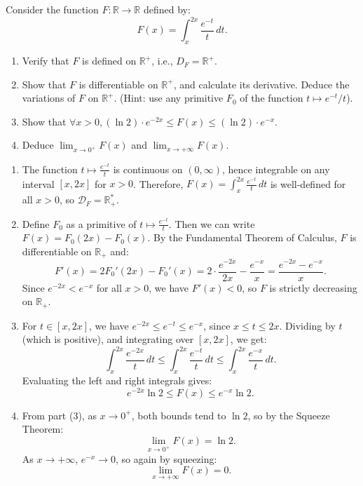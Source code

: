 \documentclass[12pt]{article}
\begin{document}
\section{}
Consider the function $F: \mathbb{R} \rightarrow \mathbb{R}$ defined by:
$$F(x)=\int_{x}^{2x} \frac{e^{-t}}{t} \, dt.$$
\begin{enumerate}
\item Verify that $F$ is defined on $\mathbb{R}^+$, i.e., $D_F = \mathbb{R}^+$.
\item Show that $F$ is differentiable on $\mathbb{R}^+$, and calculate its derivative. Deduce the variations of $F$ on $\mathbb{R}^+$.
(Hint: use any primitive $F_0$ of the function $t \mapsto e^{-t}/t$).
\item Show that $\forall x > 0, (\ln 2) \cdot e^{-2x} \leq F(x) \leq (\ln 2) \cdot e^{-x}$.
\item Deduce $\lim_{x \to 0^+} F(x)$ and $\lim_{x \to +\infty} F(x)$.
\end{enumerate}

\newpage

\begin{answerbox}
\begin{enumerate}
  \item The function $ t \mapsto \frac{e^{-t}}{t} $ is continuous on $ (0, \infty) $, hence integrable on any interval $ [x, 2x] $ for $ x > 0 $. Therefore, $ F(x) = \int_x^{2x} \frac{e^{-t}}{t} \, dt $ is well-defined for all $ x > 0 $, so $ \mathcal{D}_F = \mathbb{R}_+^* $.

  \item Define $ F_0 $ as a primitive of $ t \mapsto \frac{e^{-t}}{t} $. Then we can write $ F(x) = F_0(2x) - F_0(x) $. By the Fundamental Theorem of Calculus, $ F $ is differentiable on $ \mathbb{R}_+ $ and:
  $$
  F'(x) = 2F_0'(2x) - F_0'(x) = 2 \cdot \frac{e^{-2x}}{2x} - \frac{e^{-x}}{x} = \frac{e^{-2x} - e^{-x}}{x}.
  $$
  Since $ e^{-2x} < e^{-x} $ for all $ x > 0 $, we have $ F'(x) < 0 $, so $ F $ is strictly decreasing on $ \mathbb{R}_+ $.

  \item For $ t \in [x, 2x] $, we have $ e^{-2x} \leq e^{-t} \leq e^{-x} $, since $ x \leq t \leq 2x $. Dividing by $ t $ (which is positive), and integrating over $ [x, 2x] $, we get:
  $$
  \int_x^{2x} \frac{e^{-2x}}{t} \, dt \leq \int_x^{2x} \frac{e^{-t}}{t} \, dt \leq \int_x^{2x} \frac{e^{-x}}{t} \, dt.
  $$
  Evaluating the left and right integrals gives:
  $$
  e^{-2x} \ln 2 \leq F(x) \leq e^{-x} \ln 2.
  $$

  \item From part (3), as $ x \to 0^+ $, both bounds tend to $ \ln 2 $, so by the Squeeze Theorem:
  $$
  \lim_{x \to 0^+} F(x) = \ln 2.
  $$
  As $ x \to +\infty $, $ e^{-x} \to 0 $, so again by squeezing:
  $$
  \lim_{x \to +\infty} F(x) = 0.
  $$
\end{enumerate}
\end{answerbox}
\end{document}
